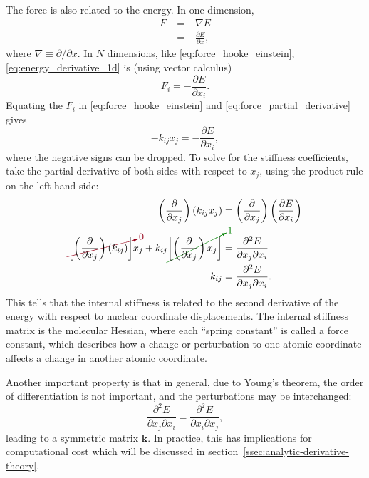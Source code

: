 \documentclass[%
class = book,%
crop = false,%
float = true,%
multi = true,%
preview = false,%
]{standalone}
\begin{document}
The force is also related to the energy. In one dimension,
\begin{align}
  \label{eq:energy_derivative_1d}
  F &= - \nabla E \\
  &= - \frac{\partial E}{\partial x},
\end{align}
where \(\nabla \equiv \partial/\partial x\). In \(N\) dimensions, like \eqref{eq:force_hooke_einstein}, \eqref{eq:energy_derivative_1d} is (using vector calculus)
\begin{equation}
  \label{eq:force_partial_derivative}
  F_{i} = - \frac{\partial E}{\partial x_{i}}.
\end{equation}
Equating the \(F_{i}\) in \eqref{eq:force_hooke_einstein} and \eqref{eq:force_partial_derivative} gives
\begin{equation}
  \label{eq:equated_force}
  - k_{ij} x_{j} = - \frac{\partial E}{\partial x_{i}},
\end{equation}
where the negative signs can be dropped. To solve for the stiffness coefficients, take the partial derivative of both sides with respect to \(x_{j}\), using the product rule on the left hand side:
\begin{align}
  \label{eq:hooke_derivation_1}
  \left( \frac{\partial}{\partial x_{j}} \right) \left( k_{ij} x_{j} \right) &= \left( \frac{\partial}{\partial x_{j}} \right) \left( \frac{\partial E}{\partial x_{i}} \right) \\
  \label{eq:hooke_derivation_2}
  \Ccancelto[carmine]{0}{\left[ \left( \frac{\partial}{\partial x_{j}} \right) \left( k_{ij} \right) \right]} x_{j} + k_{ij} \Ccancelto[Green]{1}{\left[ \left( \frac{\partial}{\partial x_{j}} \right) x_{j} \right]} &= \frac{\partial^{2} E}{\partial x_{j} \partial x_{i}} \\
  \label{eq:hooke_derivation_3}
  k_{ij} &= \frac{\partial^{2} E}{\partial x_{j} \partial x_{i}}.
\end{align}
This tells that the internal stiffness is related to the second derivative of the energy with respect to nuclear coordinate displacements. The internal stiffness matrix is the molecular Hessian, where each ``spring constant'' is called a force constant, which describes how a change or perturbation to one atomic coordinate affects a change in another atomic coordinate.

Another important property is that in general, due to Young's theorem, the order of differentiation is not important, and the perturbations may be interchanged:
\begin{equation}
  \label{eq:youngs-theorem}
  \frac{\partial^{2} E}{\partial x_{j} \partial x_{i}} = \frac{\partial^{2} E}{\partial x_{i} \partial x_{j}},
\end{equation}
leading to a symmetric matrix \(\mathbf{k}\). In practice, this has implications for computational cost which will be discussed in section~\ref{ssec:analytic-derivative-theory}.
\end{document}
